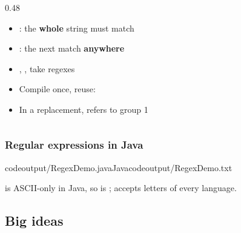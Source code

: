 \documentclass[aspectratio=169,10pt,compress]{beamer}
\begin{document}
\begin{frame}[t,fragile]
\begin{columns}[T]
\begin{column}{0.48\textwidth}
\begin{itemize}
        \item {}: the \textbf{whole} string must match
        
        \item {}: the next match \textbf{anywhere}
        
        \item {}, ,  take regexes
        
        \item Compile once, reuse: 
        
        \item In a replacement,  refers to group 1
      \end{itemize}
      
    \end{column}
  \end{columns}
\end{frame}




\begin{frame}[t,fragile] \frametitle{Regular expressions in Java}
  \lstcodeoverlaystep
  	[basicstyle=\ttfamily\tiny]
	[basicstyle=\ttfamily\tiny][0.38\textwidth]{10.2cm,2.25cm}
	{codeoutput/RegexDemo.java}{Java}{codeoutput/RegexDemo.txt}

  \vspace{0.2em}
  \small {} is ASCII-only in Java, 
  so  is ;
   accepts letters of every language.
\end{frame}






\subsection[Ideas]{Big ideas}
\end{document}

